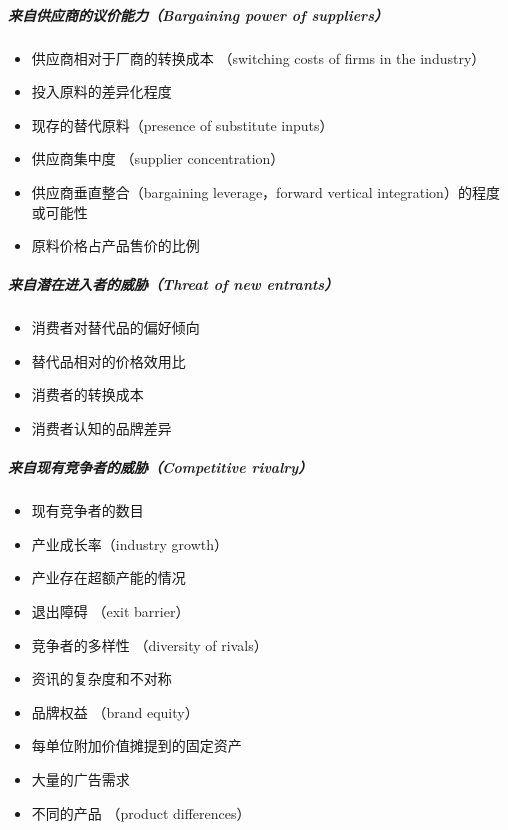 \documentclass[letterpaper,11pt,english]{sphinxmanual}
\begin{document}
\subparagraph{来自供应商的议价能力（Bargaining power of suppliers）}
\label{\detokenize{chapter_skill/BRD:bargaining-power-of-suppliers}}\begin{itemize}
\item {} 
供应商相对于厂商的转换成本 （switching costs of firms in the
industry）

\item {} 
投入原料的差异化程度

\item {} 
现存的替代原料（presence of substitute inputs）

\item {} 
供应商集中度 （supplier concentration）

\item {} 
供应商垂直整合（bargaining leverage，forward vertical
integration）的程度或可能性

\item {} 
原料价格占产品售价的比例

\end{itemize}


\subparagraph{来自潜在进入者的威胁（Threat of new entrants）}
\label{\detokenize{chapter_skill/BRD:threat-of-new-entrants}}\begin{itemize}
\item {} 
消费者对替代品的偏好倾向

\item {} 
替代品相对的价格效用比

\item {} 
消费者的转换成本

\item {} 
消费者认知的品牌差异

\end{itemize}


\subparagraph{来自现有竞争者的威胁（Competitive rivalry）}
\label{\detokenize{chapter_skill/BRD:competitive-rivalry}}\begin{itemize}
\item {} 
现有竞争者的数目

\item {} 
产业成长率（industry growth）

\item {} 
产业存在超额产能的情况

\item {} 
退出障碍 （exit barrier）

\item {} 
竞争者的多样性 （diversity of rivals）

\item {} 
资讯的复杂度和不对称

\item {} 
品牌权益 （brand equity）

\item {} 
每单位附加价值摊提到的固定资产

\item {} 
大量的广告需求

\item {} 
不同的产品 （product differences）

\end{itemize}
\end{document}
